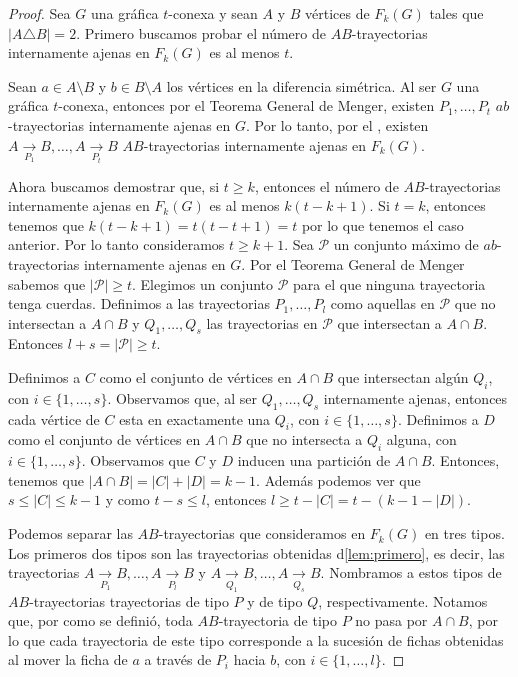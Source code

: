 \begin{proof}
    Sea $G$ una gr\'afica $t$-conexa y sean $A$ y $B$ v\'ertices de $F_{k}(G)$
    tales que $|A \triangle B| = 2$. Primero buscamos probar el n\'umero de
    $AB$-trayectorias internamente ajenas en $F_{k}(G)$ es al menos $t$. 
    
    Sean $a \in A \setminus B$ y $b \in B \setminus A$ los v\'ertices en la
    diferencia sim\'etrica. Al ser $G$ una gr\'afica $t$-conexa, entonces por el
    Teorema General de Menger, existen $P_{1}, \dots, P_{t}$ $ab$-trayectorias
    internamente ajenas en $G$. Por lo tanto, por el , existen
    $A \xrightarrow[P_1]{}  B, \dots, A \xrightarrow[P_t]{}  B$
    $AB$-trayectorias internamente ajenas en $F_{k}(G)$. 

    Ahora buscamos demostrar que, si $t \geq k$, entonces el n\'umero de
    $AB$-trayectorias internamente ajenas en $F_{k}(G)$ es al menos $k(t- k
    +1)$. Si $t=k$, entonces tenemos que $k(t - k + 1) = t(t-t+1) = t$ por lo
    que tenemos el caso anterior. Por lo tanto consideramos  $t \geq k + 1$. Sea
    $\mathcal{P}$ un conjunto m\'aximo de $ab$-trayectorias internamente ajenas
    en $G$. Por el Teorema General de Menger sabemos que $|\mathcal{P}| \ge t$.
    Elegimos un conjunto $\mathcal{P}$ para el que ninguna trayectoria tenga
    cuerdas. Definimos a las trayectorias $P_{1}, \dots, P_{l}$ como aquellas en
    $\mathcal{P}$ que no intersectan a $A \cap B$ y $Q_{1}, \dots, Q_{s}$ las
    trayectorias en $\mathcal{P}$ que intersectan a $A \cap B$. Entonces $l + s
    = |\mathcal{P}| \ge t$.

    Definimos a $C$ como el conjunto de v\'ertices en $A \cap B$ que intersectan
    alg\'un $Q_i$, con $i \in \{1, \dots, s\}$. Observamos que, al ser $Q_1,
    \dots, Q_s$ internamente ajenas, entonces cada v\'ertice de $C$ esta en
    exactamente una $Q_i$, con $i \in \{1, \dots, s\}$. Definimos a $D$ como el
    conjunto de v\'ertices en $A \cap B$ que no intersecta a $Q_i$ alguna, con
    $i \in \{1, \dots, s\}$. Observamos que $C$ y $D$ inducen una partici\'on
    de $A \cap B$. Entonces, tenemos que $|A\cap B| = |C| + |D| = k-1$. Adem\'as
    podemos ver que $s \leq |C| \leq k-1$ y como $ t - s \leq l$, entonces $l
    \geq t -|C| = t- (k-1-|D|)$.

    Podemos separar las $AB$-trayectorias que consideramos en $F_{k}(G)$ en tres
    tipos. Los primeros dos tipos son las trayectorias obtenidas
    d\cref{lem:primero}, es decir, las trayectorias $A \xrightarrow[P_1]{}  B,
    \dots, A \xrightarrow[P_l]{}  B$ y $A \xrightarrow[Q_1]{}  B, \dots, A
    \xrightarrow[Q_s]{}  B$. Nombramos a estos tipos de $AB$-trayectorias
    trayectorias de tipo $P$ y de tipo $Q$, respectivamente. Notamos que, por
    como se defini\'o, toda $AB$-trayectoria de tipo $P$ no pasa por $A\cap B$,
    por lo que cada trayectoria de este tipo corresponde a la sucesi\'on de
    fichas obtenidas al mover la ficha de $a$ a trav\'es de $P_i$ hacia $b$, con
    $i \in \{1, \dots, l\}$.
    

\end{proof}
